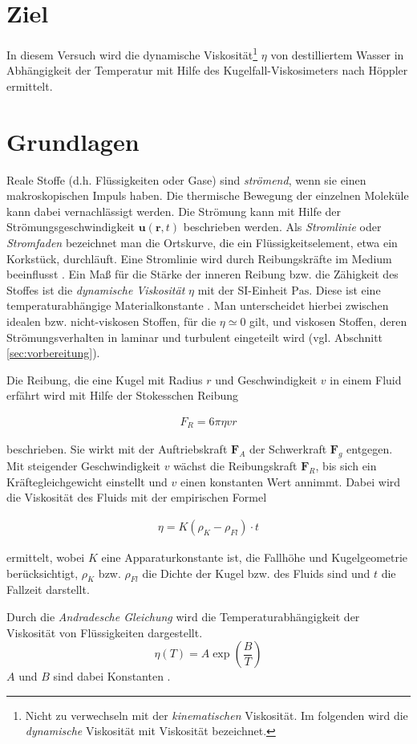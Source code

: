 \section{Ziel}
In diesem Versuch wird die dynamische Viskosität\footnote{Nicht zu verwechseln mit der \textit{kinematischen} Viskosität.
Im folgenden wird die \textit{dynamische} Viskosität mit Viskosität bezeichnet.} $\eta$ 
von destilliertem Wasser in Abhängigkeit der Temperatur mit Hilfe des Kugelfall-Viskosimeters nach Höppler ermittelt.



\section{Grundlagen}
\label{sec:grundlagen}
Reale Stoffe (d.h. Flüssigkeiten oder Gase) sind \textit{strömend}, wenn sie einen makroskopischen Impuls haben.
Die thermische Bewegung der einzelnen Moleküle kann dabei vernachlässigt werden.
Die Strömung kann mit Hilfe der Strömungsgeschwindigkeit $\symbf{u}\left(\symbf{r},t\right)$ beschrieben werden.
Als \textit{Stromlinie} oder \textit{Stromfaden} bezeichnet man die Ortskurve, die ein Flüssigkeitselement, etwa ein Korkstück, durchläuft.
Eine Stromlinie wird durch Reibungskräfte im Medium beeinflusst \cite[]{demtroeder}.
Ein Maß für die Stärke der inneren Reibung bzw. die Zähigkeit des Stoffes ist die \textit{dynamische Viskosität} $\eta$ mit der SI-Einheit $\unit{\Pa \s}$.
Diese ist eine temperaturabhängige Materialkonstante \cite[]{geschke}.
Man unterscheidet hierbei zwischen idealen bzw. nicht-viskosen Stoffen, für die $\eta \simeq 0$ gilt, und viskosen Stoffen,
deren Strömungsverhalten in laminar und turbulent eingeteilt wird (vgl. Abschnitt \ref{sec:vorbereitung}).

Die Reibung, die eine Kugel mit Radius $r$ und Geschwindigkeit $v$ in einem Fluid erfährt wird mit Hilfe der Stokesschen Reibung 

\begin{align}
    F_R = 6 \pi \eta v r    
\end{align}

beschrieben.
Sie wirkt mit der Auftriebskraft $\symbf{F}_A$ der Schwerkraft $\symbf{F}_g$ entgegen. 
Mit steigender Geschwindigkeit $v$ wächst die Reibungskraft $\symbf{F}_R$, bis sich ein Kräftegleichgewicht einstellt
und $v$ einen konstanten Wert annimmt.
Dabei wird die Viskosität des Fluids mit der empirischen Formel 

\begin{align}
    \label{eq:empirisch}
    \eta = K \left(\rho_K -\rho_{Fl}\right) \cdot t
\end{align}

ermittelt, wobei $K$ eine Apparaturkonstante ist, die Fallhöhe und Kugelgeometrie berücksichtigt,
$\rho_K$ bzw. $\rho_{Fl}$ die Dichte der Kugel bzw. des Fluids sind und $t$ die Fallzeit darstellt.


Durch die \textit{Andradesche Gleichung} wird die Temperaturabhängigkeit der Viskosität von Flüssigkeiten dargestellt.
\begin{equation}
\label{eq:andrade}
    \eta \left(T\right) = A \exp{\left(\frac{B}{T}\right)}
\end{equation}
$A$ und $B$ sind dabei Konstanten \cite*[]{va207}.

